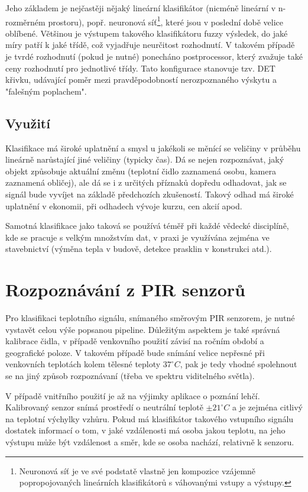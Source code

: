 \documentclass[10pt,a4paper,titlepage]{article}
\begin{document}
  Jeho základem je nejčastěji nějaký lineární klasifikátor (nicméně lineární v n-rozměrném prostoru),
  popř. neuronová síť\footnote{Neuronová síť je ve své podstatě vlastně jen kompozice vzájemně
  popropojovaných lineárních klasifikátorů s váhovanými vstupy a výstupy.}, které jsou v poslední době
  velice oblíbené. Většinou je výstupem takového klasifikátoru fuzzy výsledek, do jaké míry patří k
  jaké třídě, což vyjadřuje neurčitost rozhodnutí. V takovém případě je tvrdé rozhodnutí (pokud je nutné)
  ponecháno postprocessor, který zvažuje také ceny rozhodnutí pro jednotlivé třídy. Tato konfigurace
  stanovuje tzv. DET křivku, udávající poměr mezi pravděpodobností nerozpoznaného výskytu a
  "falešným poplachem". \cite{IKRclassification}

  \subsection{Využití}
  Klasifikace má široké uplatnění a smysl u jakékoli se měnící se veličiny v průběhu lineárně narůstající
  jiné veličiny (typicky čas). Dá se nejen rozpoznávat, jaký objekt způsobuje aktuální změnu
  (teplotní čidlo zaznamená osobu, kamera zaznamená obličej), ale dá se i z určitých příznaků
  dopředu odhadovat, jak se signál bude vyvíjet na základě předchozích zkušeností. Takový odhad
  má široké uplatnění v ekonomii, při odhadech vývoje kurzu, cen akcií apod.

  Samotná klasifikace jako taková se používá téměř při každé vědecké disciplíně, kde se pracuje
  s velkým množstvím dat, v praxi je využívána zejména ve stavebnictví (výměna tepla v budově,
  detekce prasklin v konstrukci atd.).

  \section{Rozpoznávání z PIR senzorů}
  Pro klasifikaci teplotního signálu, snímaného směrovým PIR senzorem, je nutné vystavět celou
  výše popsanou pipeline. Důležitým aspektem je také správná kalibrace čidla, v případě venkovního
  použití závisí na ročním období a geografické poloze. V takovém případě bude snímání velice nepřesné
  při venkovních teplotách kolem tělesné teploty $37^{\circ}C$, pak je tedy vhodné
  spolehnout se na jiný způsob rozpoznávaní (třeba ve spektru viditelného světla).

  V případě vnitřního použití je až na výjimky aplikace o poznání lehčí. Kalibrovaný senzor snímá prostředí
  o neutrální teplotě $\pm 21^{\circ}C$ a je zejména citlivý na teplotní výchylky vzhůru.
  Pokud má klasifikátor takového vstupního signálu dostatek informací o tom, v jaké vzdálenosti má
  osoba jakou teplotu, na jeho výstupu může být vzdálenost a směr, kde se osoba nachází, relativně k senzoru.
\end{document}
